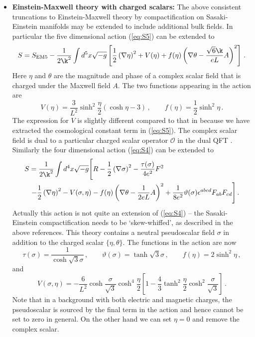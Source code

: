 \documentclass[10pt, oneside]{book}
\def\be{\begin{equation}}
\def\ee{\end{equation}}
\newcommand{\bea}{\begin{eqnarray}}
\newcommand{\eea}{\end{eqnarray}}
\def\ocal{{\mathcal{O}}}
\begin{document}
\begin{doublespace}
\begin{itemize}
\item {\bf Einstein-Maxwell theory with charged scalars:} The above consistent truncations to Einstein-Maxwell theory by compactification on Sasaki-Einstein manifolds may be extended to include additional bulk fields. In particular the five dimensional action (\ref{eq:S5}) can be extended to \cite{Gubser:2009qm, Gubser:2009gp}
\be
S = S_\text{EM5} - \frac{1}{2 \k^2} \int d^5x \sqrt{-g} \left[ \frac{1}{2} \left(\nabla \eta \right)^2 + V(\eta) + f(\eta) \left(\nabla \theta - \frac{\sqrt{6} \k}{e L} A \right)^2 \right] \,.
\ee
Here $\eta$ and $\theta$ are the magnitude and phase of a complex scalar field that is charged under the Maxwell field $A$. The two functions appearing in the action are
\be
V(\eta) = \frac{3}{L^2} \sinh^2 \frac{\eta}{2}\left(\cosh \eta - 3 \right) \,, \qquad f(\eta) = \frac{1}{2} \sinh^2\eta \,.
\ee
The expression for $V$ is slightly different compared to that in \cite{Gubser:2009qm, Gubser:2009gp} because we have extracted the cosmological constant term in (\ref{eq:S5}). The complex scalar field is dual to a particular charged scalar operator $\ocal$ in the dual QFT \cite{Gubser:2009qm}. Similarly the four dimensional action (\ref{eq:S4}) can be extended to \cite{Denef:2009tp, Gauntlett:2009dn, Gauntlett:2009bh, Donos:2012yu}
\bea
\lefteqn{S = \frac{1}{2 \k^2} \int d^4x \sqrt{-g} \Bigg[ R - \frac{1}{2} \left(\nabla \sigma \right)^2 - \frac{\tau(\sigma)}{4 e^2} F^2} \nonumber \\
&& - \frac{1}{2} \left(\nabla \eta \right)^2 - V(\sigma,\eta) - f(\eta) \left(\nabla \theta - \frac{1}{2eL} A \right)^2 + \frac{1}{8 e^2}  \vartheta(\sigma) \epsilon^{abcd} F_{ab} F_{cd}\Bigg] \,. \label{eq:4dsc}
\eea
Actually this action is not quite an extension of (\ref{eq:S4}) -- the Sasaki-Einstein compactification needs to be `skew-whiffed', as described in the above references.
This theory contains a neutral pseudoscalar field $\sigma$ in addition to the charged scalar $\{\eta,\theta\}$. The functions in the action are now
\be
\tau(\sigma) = \frac{1}{\cosh \sqrt{3} \sigma} \,, \qquad \vartheta(\sigma) = \tanh \sqrt{3} \sigma \,, \qquad
f(\eta) = 2 \sinh^2 \eta \,,
\ee
and
\be
V(\sigma,\eta) = - \frac{6}{L^2} \cosh \frac{\sigma}{\sqrt{3}} \cosh^4 \frac{\eta}{2} \left[1 - \frac{4}{3} \tanh^2\frac{\eta}{2} \cosh^2\frac{\sigma}{\sqrt{3}} \right] \,.
\ee
Note that in a background with both electric and magnetic charges, the pseudoscalar is sourced by the final term in the action and hence cannot be set to zero in general. On the other hand we can set $\eta = 0$ and remove the complex scalar.


\end{itemize}
\end{doublespace}
\end{document}
